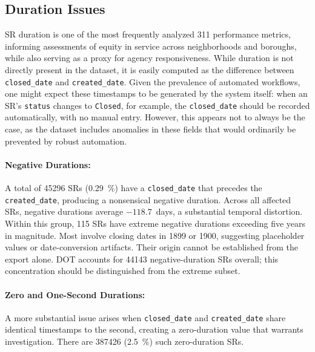 \documentclass[linenumber]{jdsart}
\begin{document}
\subsection{Duration Issues}
\label{subsec:duration}

SR duration is one of the most frequently analyzed 311 
performance metrics, informing assessments of equity in service across 
neighborhoods and boroughs, while also serving as a proxy for agency
responsiveness.  While duration is not directly 
present in the dataset, it is easily computed as the difference between
\texttt{closed\_date} and \texttt{created\_date}. Given the prevalence 
of automated workflows, one might expect these
timestamps to be generated by the system itself: when an SR's
\texttt{status} changes to \texttt{Closed}, for example, the
\texttt{closed\_date} should be recorded automatically, with no
manual entry. However, this appears not to always be the case, as 
the dataset includes anomalies in these fields that would ordinarily be
prevented by robust automation.

\paragraph{Negative Durations:}
\label{par:negativedurations}
A total of \num{45296} SRs (\SI{0.29}{\percent}) have a
\texttt{closed\_date} that precedes the \texttt{created\_date},
producing a nonsensical negative duration. Across all affected SRs,
negative durations average $-118.7$~days, a substantial temporal
distortion. Within this group, \num{115} SRs have extreme negative
durations exceeding five years in magnitude. Most involve closing
dates in 1899 or 1900, suggesting placeholder values or date-conversion
artifacts. Their origin cannot be established from the export alone.
DOT accounts for \num{44143} negative-duration SRs overall; this
concentration should be distinguished from the extreme subset.

\paragraph{Zero and One-Second Durations:}
A more substantial issue arises when \texttt{closed\_date} and
\texttt{created\_date} share identical timestamps to the second,
creating a zero-duration value that warrants investigation. There are \num{387426}
(\SI{2.5}{\percent}) such zero-duration SRs. 
\end{document}
